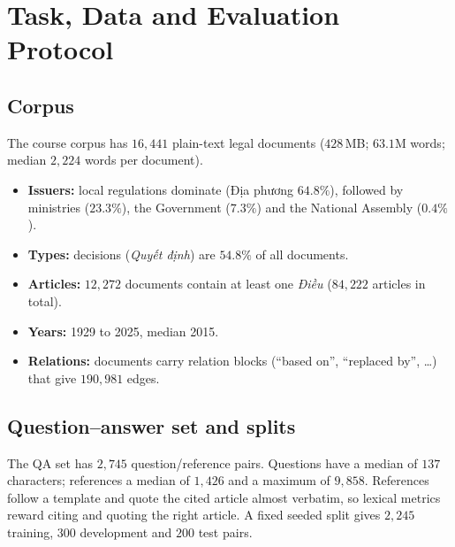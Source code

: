 \documentclass[11pt,a4paper]{article}
\newcommand{\dieu}{\textit{Điều}}
\begin{document}
\section{Task, Data and Evaluation Protocol}\label{sec:data}

\subsection{Corpus}
The course corpus has $16{,}441$ plain-text legal documents ($428$\,MB; $63.1$M words; median $2{,}224$ words per document).
\begin{itemize}[leftmargin=*]
\item \textbf{Issuers:} local regulations dominate (Địa phương $64.8\%$), followed by ministries ($23.3\%$), the Government ($7.3\%$) and the National Assembly ($0.4\%$).
\item \textbf{Types:} decisions (\textit{Quyết định}) are $54.8\%$ of all documents.
\item \textbf{Articles:} $12{,}272$ documents contain at least one \dieu{} ($84{,}222$ articles in total).
\item \textbf{Years:} 1929 to 2025, median 2015.
\item \textbf{Relations:} documents carry relation blocks (``based on'', ``replaced by'', \ldots) that give $190{,}981$ edges.
\end{itemize}

\subsection{Question--answer set and splits}
The QA set has $2{,}745$ question/reference pairs. Questions have a median of $137$ characters; references a median of $1{,}426$ and a maximum of $9{,}858$. References follow a template and quote the cited article almost verbatim, so lexical metrics reward citing and quoting the right article. A fixed seeded split gives $2{,}245$ training, $300$ development and $200$ test pairs.
\end{document}
